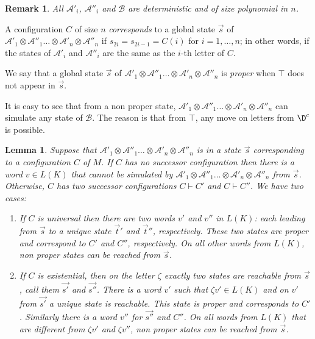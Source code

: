\documentclass{LMCS}
\theoremstyle{plain}\newtheorem{remark}{Remark}
\theoremstyle{plain}\newtheorem{lemma}[thm]{Lemma}
\renewcommand{\Aa}{\mathcal{A}}
\renewcommand{\Bb}{\mathcal{B}}
\newcommand{\vecs}{\vec s}
\newcommand{\vecsp}{\vec{s'}}
\newcommand{\vecspp}{\vec{s''}}
\newcommand{\vect}{\vec t}
\newcommand{\vAap}{\Aa'_1\otimes\Aa''_1\dots\otimes\Aa'_n\otimes\Aa''_n}
\newcommand{\choice}{\zeta}
\begin{document}
\begin{remark}
  All $\Aa'_i$, $\Aa''_i$ and $\Bb$ are deterministic and of size
  polynomial in $n$.
\end{remark}


\begin{defi}\label{df:cor}
  A configuration $C$ of size $n$ \emph{corresponds} to a global state
    $\vec s$ of $\vAap$ if $s_{2i}=s_{2i-1}=C(i)$  for $i=1,\dots,n$;
    in other words, if the states of $\Aa'_i$ and $\Aa''_i$ are the
    same as the $i$-th letter of $C$.
\end{defi}

\begin{defi}
  We say that a global state $\vecs$ of $\vAap$ is \emph{proper}
  when $\top$ does not appear in $\vecs$.
\end{defi}

It is easy to see that from a non proper state, $\vAap$ can simulate 
any state of $\Bb$. The reason is that from $\top$,
 any move on letters from $\D^c$ is possible.

\begin{lemma}\label{lemma:mainexp}
  Suppose that $\vAap$ is in a state $\vec s$ corresponding to a
  configuration $C$ of $M$. If $C$ has no successor configuration
  then there is a word $v\in
  L(K)$ that cannot be simulated by  $\vAap$ from $\vecs$. Otherwise, $C$ has two
  successor configurations $C\vdash C'$ and $C\vdash C''$. We have two cases:
  \begin{enumerate}[$\bullet$]

  \item If $C$ is universal then there are two words $v'$ and $v''$ in
    $L(K)$: each leading from $\vecs$ to a unique state $\vect'$ and
    $\vect''$, respectively. These two states are proper and
    correspond to $C'$ and $C''$, respectively. On all other words
    from $L(K)$, non proper states can be reached from $\vecs$.

  \item If $C$ is existential, then on the letter $\choice$ exactly
    two states are reachable from $\vecs$, call them $\vecsp$ and
    $\vecspp$. There is a word $v'$ such that $\choice v' \in L(K)$
    and on $v'$ from $\vecsp$ a unique state is reachable. This state
    is proper and corresponds to $C'$. Similarly there is a word $v''$
    for $\vecspp$ and $C''$. On all words from $L(K)$ that are different from $\choice
    v'$ and $\choice v''$, non proper states can be reached from
    $\vecs$.
  \end{enumerate}
\end{lemma}
\end{document}
